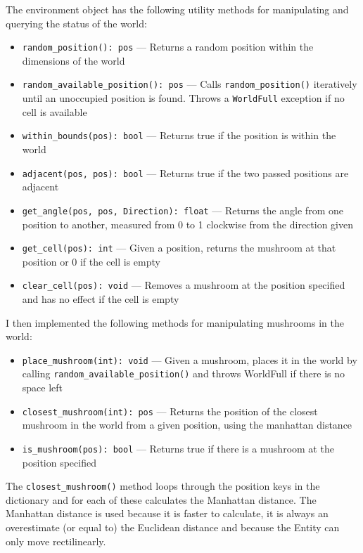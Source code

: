 \documentclass[12pt,a4paper,twoside,openright]{report}
\begin{document}
The environment object has the following utility methods for manipulating and querying the status of the world:

\begin{itemize}
	\item \texttt{random\_position(): pos} --- Returns a random position within the dimensions of the world
	\item \texttt{random\_available\_position(): pos} --- Calls \texttt{random\_position()} iteratively until an unoccupied position is found. Throws a \texttt{WorldFull} exception if no cell is available
	\item \texttt{within\_bounds(pos): bool} --- Returns true if the position is within the world
	\item \texttt{adjacent(pos, pos): bool} --- Returns true if the two passed positions are adjacent
	\item \texttt{get\_angle(pos, pos, Direction): float} --- Returns the angle from one position to another, measured from 0 to 1 clockwise from the direction given
	\item \texttt{get\_cell(pos): int} --- Given a position, returns the mushroom at that position or 0 if the cell is empty
	\item \texttt{clear\_cell(pos): void} --- Removes a mushroom at the position specified and has no effect if the cell is empty
\end{itemize}

I then implemented the following methods for manipulating mushrooms in the world:

\begin{itemize}
	\item \texttt{place\_mushroom(int): void} --- Given a mushroom, places it in the world by calling \texttt{random\_available\_position()} and throws WorldFull if there is no space left
	\item \texttt{closest\_mushroom(int): pos} --- Returns the position of the closest mushroom in the world from a given position, using the manhattan distance
	\item \texttt{is\_mushroom(pos): bool} --- Returns true if there is a mushroom at the position specified
\end{itemize}

The \texttt{closest\_mushroom()} method loops through the position keys in the dictionary and for each of these calculates the Manhattan distance. The Manhattan distance is used because it is faster to calculate, it is always an overestimate (or equal to) the Euclidean distance and because the Entity can only move rectilinearly. 
\end{document}
